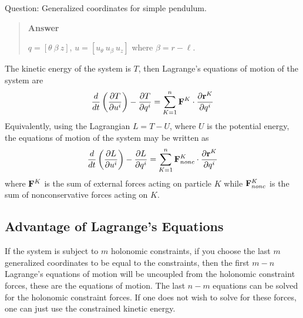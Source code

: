 \documentclass[
  letterpaper,
  DIV=11,
  numbers=noendperiod]{scrreprt}
\newcommand{\lp}{\left(}
\newcommand{\rp}{\right)}
\begin{document}
\begin{tcolorbox}[enhanced jigsaw, arc=.35mm, bottomrule=.15mm, bottomtitle=1mm, breakable, colback=white, colbacktitle=quarto-callout-tip-color!10!white, colframe=quarto-callout-tip-color-frame, coltitle=black, left=2mm, leftrule=.75mm, opacityback=0, opacitybacktitle=0.6, rightrule=.15mm, title=\textcolor{quarto-callout-tip-color}{\faLightbulb}\hspace{0.5em}{Think!}, titlerule=0mm, toprule=.15mm, toptitle=1mm]

Question: Generalized coordinates for simple pendulum.

\begin{quote}
\textbf{Answer}

\(q = [\theta\ \beta\ z]\), \(u = [u_\theta\ u_\beta\ u_z]\) where
\(\beta = r-\ell\).
\end{quote}

\end{tcolorbox}

The kinetic energy of the system is \(T\), then Lagrange's equations of
motion of the system are \begin{align}
    \frac{d}{dt}\lp\frac{\partial T}{\partial u^i}\rp-\frac{\partial T}{\partial q^i} = \sum_{K=1}^n{\bf F}^K\cdot \frac{\partial {\bf r}^K}{\partial q^i}
\end{align} Equivalently, using the Lagrangian \(L = T-U\), where \(U\)
is the potential energy, the equations of motion of the system may be
written as \begin{align}
    \frac{d}{dt}\lp\frac{\partial L}{\partial u^i}\rp-\frac{\partial L}{\partial q^i} = \sum_{K=1}^n{\bf F}_{nonc}^K\cdot \frac{\partial {\bf r}^K}{\partial q^i}
\end{align} where \({\bf F}^K\) is the sum of external forces acting on
particle \(K\) while \({\bf F}_{nonc}^K\) is the sum of nonconservative
forces acting on \(K\).

\subsection{Advantage of Lagrange's
Equations}\label{advantage-of-lagranges-equations}

If the system is subject to \(m\) holonomic constraints, if you choose
the last \(m\) generalized coordinates to be equal to the constraints,
then the first \(m-n\) Lagrange's equations of motion will be uncoupled
from the holonomic constraint forces, these are the equations of motion.
The last \(n-m\) equations can be solved for the holonomic constraint
forces. If one does not wish to solve for these forces, one can just use
the constrained kinetic energy.
\end{document}
